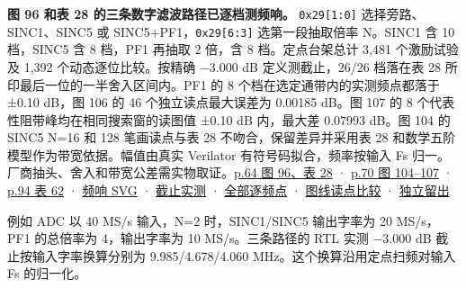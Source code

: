 \documentclass[UTF8,fontset=none,zihao=-4,a4paper]{ctexart}
\newcommand{\TraceCode}[1]{\texttt{\mdseries\upshape #1}}
\begin{document}
\textbf{图 96 和表 28 的三条数字滤波路径已逐档测频响。} \TraceCode{0x29[\relax{}1:\penalty150\relax{}0]\penalty150\relax{}} 选择旁路、\allowbreak{}SINC1、\allowbreak{}SINC5 或 SINC5+\relax{}PF1，\TraceCode{0x29[\penalty150\relax{}6:\penalty150\relax{}3]\penalty150\relax{}} 选第一段抽取倍率 N。SINC1 含 10 档，SINC5 含 8 档，PF1 再抽取 2 倍，含 8 档。定点台架总计 3,481 个激励试验及 1,392 个动态逐位比较。按精确 −3.000 dB 定义测截止，26/26 档落在表 28 所印最后一位的一半舍入区间内。PF1 的 8 个档在选定通带内的实测频点都落于 ±0.10 dB，图 106 的 46 个独立读点最大误差为 0.00185 dB。图 107 的 8 个代表性阻带峰均在相同搜索窗的读图值 ±0.10 dB 内，最大差 0.07993 dB。图 104 的 SINC5 N=16 和 128 笔画读点与表 28 不吻合，保留差异并采用表 28 和数学五阶模型作为带宽依据。幅值由真实 Verilator 有符号码拟合，频率按输入 Fs 归一。厂商抽头、\allowbreak{}舍入和带宽公差需实物取证。\href{https://www.analog.com/media/en/technical-documentation/data-sheets/ad4080.pdf\#page=64}{p.64 图 96、\allowbreak{}表 28} · \href{https://www.analog.com/media/en/technical-documentation/data-sheets/ad4080.pdf\#page=70}{p.70 图 104–107} · \href{https://www.analog.com/media/en/technical-documentation/data-sheets/ad4080.pdf\#page=94}{p.94 表 62} · \href{https://github.com/defineiocc02/20bit\_SAR\_ADC\_Behaviour\_Verification/blob/feat/ad4080-peripherals/subsys/ad4080\_peripherals/figures/filter-response.svg}{频响 SVG} · \href{https://github.com/defineiocc02/20bit\_SAR\_ADC\_Behaviour\_Verification/blob/feat/ad4080-peripherals/subsys/ad4080\_peripherals/interfaces/dsp\_review/evidence/filter\_summary.csv}{截止实测} · \href{https://github.com/defineiocc02/20bit\_SAR\_ADC\_Behaviour\_Verification/blob/feat/ad4080-peripherals/subsys/ad4080\_peripherals/interfaces/dsp\_review/evidence/filter\_response.csv}{全部逐频点} · \href{https://github.com/defineiocc02/20bit\_SAR\_ADC\_Behaviour\_Verification/blob/feat/ad4080-peripherals/subsys/ad4080\_peripherals/interfaces/dsp\_review/evidence/figure\_comparison.csv}{图线读点比较} · \href{https://github.com/defineiocc02/20bit\_SAR\_ADC\_Behaviour\_Verification/blob/feat/ad4080-peripherals/subsys/ad4080\_peripherals/interfaces/dsp\_review/evidence/fig106\_holdout.csv}{独立留出}\par

例如 ADC 以 40 MS/s 输入，N=2 时，SINC1/\relax{}SINC5 输出字率为 20 MS/s，PF1 的总倍率为 4，输出字率为 10 MS/s。三条路径的 RTL 实测 −3.000 dB 截止按输入字率换算分别为 9.\relax{}985/\relax{}4.\relax{}678/\relax{}4.\relax{}060 MHz。这个换算沿用定点扫频对输入 Fs 的归一化。\par
\end{document}
